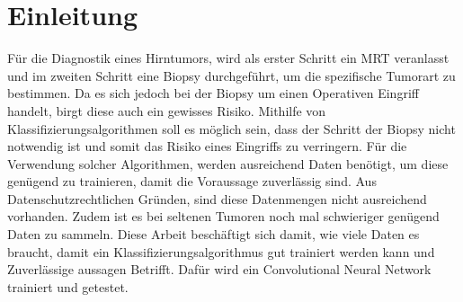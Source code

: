 \chapter{Einleitung}

Für die Diagnostik eines Hirntumors, wird als erster Schritt ein MRT veranlasst und im zweiten Schritt eine Biopsy 
durchgeführt, um die spezifische Tumorart zu bestimmen.
Da es sich jedoch bei der Biopsy um einen Operativen Eingriff handelt, birgt diese auch ein gewisses Risiko.
Mithilfe von Klassifizierungsalgorithmen soll es möglich sein, dass der Schritt der Biopsy nicht notwendig ist 
und somit das Risiko eines Eingriffs  zu verringern.
Für die Verwendung solcher Algorithmen, werden ausreichend Daten benötigt, um diese genügend zu trainieren, damit die 
Voraussage zuverlässig sind. 
Aus Datenschutzrechtlichen Gründen, sind diese Datenmengen nicht ausreichend vorhanden. Zudem ist es bei seltenen
Tumoren noch mal schwieriger genügend Daten zu sammeln.
Diese Arbeit beschäftigt sich damit, wie viele Daten es braucht, damit ein Klassifizierungsalgorithmus gut trainiert werden
kann und Zuverlässige aussagen Betrifft. 
Dafür wird ein Convolutional Neural Network trainiert und getestet.

